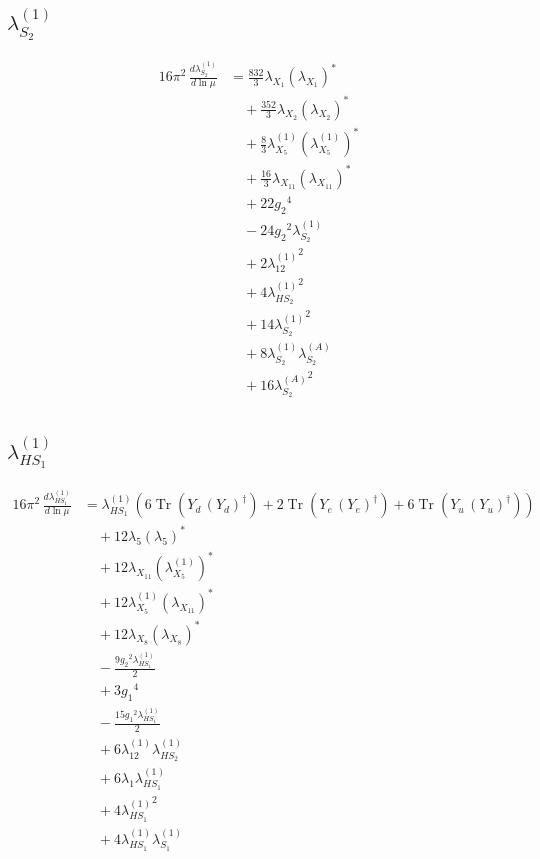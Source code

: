 \documentclass[10pt,a4paper]{article}
\begin{document}
\subsection*{$\lambda_{S_2}^{(1)}$}
\begin{align*}
16\pi^2\,\frac{d \lambda_{S_2}^{(1)}}{d\ln\mu} &=\frac{832}{3} {\lambda_{X_{1}}} \left({\lambda_{X_{1}}}\right)^{*} \\
&\quad +\frac{352}{3} {\lambda_{X_{2}}} \left({\lambda_{X_{2}}}\right)^{*} \\
&\quad +\frac{8}{3} {\lambda_{X_{5}}^{(1)}} \left({\lambda_{X_{5}}^{(1)}}\right)^{*} \\
&\quad +\frac{16}{3} {\lambda_{X_{11}}} \left({\lambda_{X_{11}}}\right)^{*} \\
&\quad +22 {g_2}^4 \\
&\quad -24 {g_2}^2 {\lambda_{S_2}^{(1)}} \\
&\quad +2 {\lambda_{12}^{(1)}}^2 \\
&\quad +4 {\lambda_{HS_2}^{(1)}}^2 \\
&\quad +14 {\lambda_{S_2}^{(1)}}^2 \\
&\quad +8 {\lambda_{S_2}^{(1)}} {\lambda_{S_2}^{(A)}} \\
&\quad +16 {\lambda_{S_2}^{(A)}}^2 \\
\end{align*}
\subsection*{$\lambda_{HS_1}^{(1)}$}
\begin{align*}
16\pi^2\,\frac{d \lambda_{HS_1}^{(1)}}{d\ln\mu} &={\lambda_{HS_1}^{(1)}} (6 \operatorname{Tr}\!\left({Y_d}\,\left({Y_d}\right)^{\dagger}\right)+2 \operatorname{Tr}\!\left({Y_e}\,\left({Y_e}\right)^{\dagger}\right)+6 \operatorname{Tr}\!\left({Y_u}\,\left({Y_u}\right)^{\dagger}\right)) \\
&\quad +12 {\lambda_5} \left({\lambda_5}\right)^{*} \\
&\quad +12 {\lambda_{X_{11}}} \left({\lambda_{X_{5}}^{(1)}}\right)^{*} \\
&\quad +12 {\lambda_{X_{5}}^{(1)}} \left({\lambda_{X_{11}}}\right)^{*} \\
&\quad +12 {\lambda_{X_{8}}} \left({\lambda_{X_{8}}}\right)^{*} \\
&\quad -\frac{9 {g_2}^2 {\lambda_{HS_1}^{(1)}}}{2} \\
&\quad +3 {g_1}^4 \\
&\quad -\frac{15 {g_1}^2 {\lambda_{HS_1}^{(1)}}}{2} \\
&\quad +6 {\lambda_{12}^{(1)}} {\lambda_{HS_2}^{(1)}} \\
&\quad +6 {\lambda_1} {\lambda_{HS_1}^{(1)}} \\
&\quad +4 {\lambda_{HS_1}^{(1)}}^2 \\
&\quad +4 {\lambda_{HS_1}^{(1)}} {\lambda_{S_1}^{(1)}} \\
\end{align*}
\end{document}
